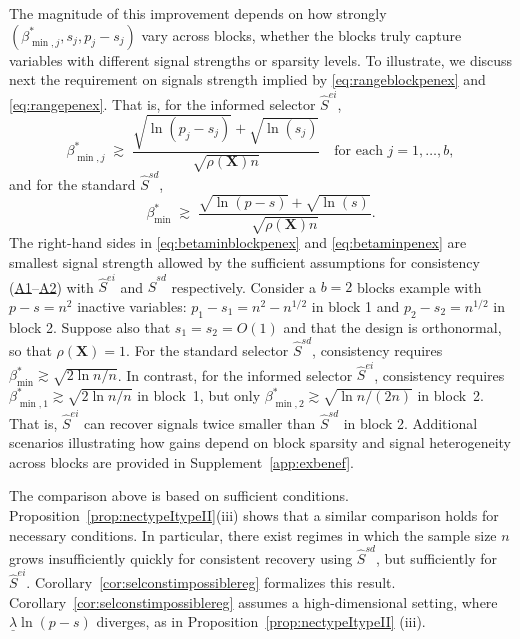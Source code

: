 \documentclass[
  12pt]{article}
\newcommand{\bX}{\mathbf{X}}
\begin{document}
The magnitude of this improvement depends on how strongly $(\beta_{\min,j}^*, s_j, p_j-s_j)$ vary across blocks, whether the blocks truly capture variables with different signal strengths or sparsity levels. To illustrate, we discuss next the requirement on signals strength implied by \eqref{eq:rangeblockpenex} and \eqref{eq:rangepenex}. That is,
for the informed selector $\hat S^{ei}$,
\begin{equation}\label{eq:betaminblockpenex}
\beta^*_{\min,j}
\;\gtrsim\;
\frac{\sqrt{\ln(p_j-s_j)}+\sqrt{\ln(s_j)}}{\sqrt{\rho(\bX)n}}\quad\text{for each }j=1,\ldots,b,
\end{equation}
and for the standard $\hat S^{sd}$,
\begin{equation}\label{eq:betaminpenex}
\beta^*_{\min}
\;\gtrsim\;
\frac{\sqrt{\ln(p-s)}+\sqrt{\ln(s)}}{\sqrt{\rho(\bX)n}}.
\end{equation}
The right-hand sides in \eqref{eq:betaminblockpenex} and \eqref{eq:betaminpenex} are smallest signal strength allowed by the sufficient assumptions for consistency (\hyperlink{lab:A1}{A1}–\hyperlink{lab:A2}{A2}) with $\hat S^{ei}$ and $\hat S^{sd}$ respectively. 
Consider a $b=2$ blocks example with $p-s=n^2$ inactive variables:
$p_1-s_1=n^{2}-n^{1/2}$ in block 1 and $p_2-s_2=n^{1/2}$ in block 2.
Suppose also that $s_1=s_2=O(1)$ and that the design is orthonormal, so that $\rho(\bX)=1$. For the standard selector $\hat S^{sd}$, consistency requires $\beta^*_{\min}\gtrsim\sqrt{2\ln n / n}$.
In contrast, for the informed selector $\hat S^{ei}$, consistency requires $\beta^*_{\min,1}\gtrsim\sqrt{2\ln n / n}$ in block~1, but only $\beta^*_{\min,2}\gtrsim\sqrt{\ln n / (2n)}$ in block~2. That is, $\hat S^{ei}$ can recover signals twice smaller than $\hat S^{sd}$ in block 2. Additional scenarios illustrating how gains depend on block sparsity and signal heterogeneity across blocks are provided in Supplement~\ref{app:exbenef}.

The comparison above is based on sufficient conditions.
Proposition~\ref{prop:nectypeItypeII}(iii) shows that a similar comparison holds for necessary conditions.
In particular, there exist regimes in which the sample size $n$ grows insufficiently quickly for consistent recovery using $\hat S^{sd}$, but sufficiently for $\hat S^{ei}$.
Corollary~\ref{cor:selconstimpossiblereg} formalizes this result.
Corollary~\ref{cor:selconstimpossiblereg} assumes a high-dimensional setting, where $\underline{\lambda} \ln(p-s)$ diverges, as in Proposition~\ref{prop:nectypeItypeII} (iii). 
\end{document}
